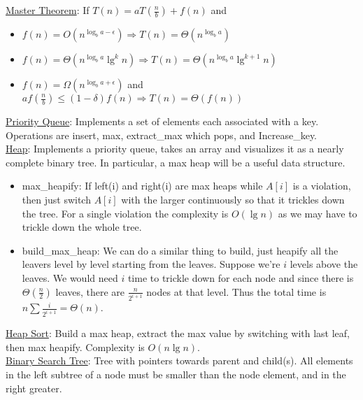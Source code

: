 \documentclass{article}
\begin{document}
\setlength{\abovedisplayskip}{0pt}
\setlength{\belowdisplayskip}{0pt}
\setlength{\abovedisplayshortskip}{0pt}
\setlength{\belowdisplayshortskip}{0pt}
\underline{Master Theorem}: If $T(n)=aT(\frac{n}{b})+f(n)$ and\\
\vspace{-5mm} 
\begin{itemize}
 \setlength{\itemsep}{1pt}
\item $f(n)=O(n^{\log_b a-\epsilon})\Rightarrow T(n)=\Theta(n^{\log_b a})$
\item $f(n)=\Theta(n^{\log_b a}\lg^k n) \Rightarrow T(n) = \Theta(n^{\log_b a} \lg^{k+1} n)$
\item $f(n)=\Omega (n^{\log_b a +\epsilon})$ and $af(\frac{n}{b})\leq (1-\delta) f(n) \Rightarrow T(n)=\Theta(f(n))$
\end{itemize}
\vspace{-1mm}
\underline{Priority Queue}: Implements a set of elements each associated with a key. Operations are insert, max, extract\_max which pops, and Increase\_key.\\
\underline{Heap}: Implements a priority queue, takes an array and visualizes it as a nearly complete binary tree. In particular, a max heap will be a useful data structure.
\vspace{-1mm} 
\begin{itemize}
 \setlength{\itemsep}{1pt}
\item max\_heapify: If left(i) and right(i) are max heaps while $A[i]$ is a violation, then just switch $A[i]$ with the larger continuously so that it trickles down the tree. For a single violation the complexity is $O(\lg n)$ as we may have to trickle down the whole tree.
\item build\_max\_heap: We can do a similar thing to build, just heapify all the leavers level by level starting from the leaves. Suppose we're $i$ levels above the leaves. We would need $i$ time to trickle down for each node and since there is $\Theta(\frac{n}{2})$ leaves, there are $\frac{n}{2^{i+1}}$ nodes at that level. Thus the total time is $n\sum \frac{i}{2^{i+1}}=\Theta(n)$.
\end{itemize}
\vspace{-1mm}
\underline{Heap Sort}: Build a max heap, extract the max value by switching with last leaf, then max heapify. Complexity is $O(n\lg n)$.\\
\underline{Binary Search Tree}: Tree with pointers towards parent and child(s). All elements in the left subtree of a node must be smaller than the node element, and in the right greater.
\end{document}
